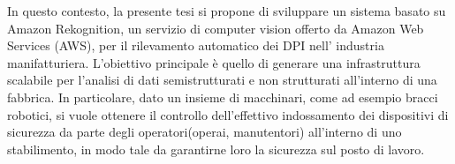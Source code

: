 In questo contesto, la presente tesi si propone di sviluppare un sistema basato su Amazon Rekognition, un servizio di computer vision offerto da Amazon Web Services (AWS), per il rilevamento automatico dei DPI nell' industria manifatturiera. L'obiettivo principale è quello di generare una infrastruttura scalabile per l’analisi di dati semistrutturati e non strutturati all’interno di una fabbrica. In particolare, dato un insieme di macchinari, come ad esempio bracci robotici, si vuole ottenere il controllo dell’effettivo indossamento dei dispositivi di sicurezza da parte degli operatori(operai, manutentori) all'interno di uno stabilimento, in modo tale da garantirne loro la sicurezza sul posto di lavoro.
